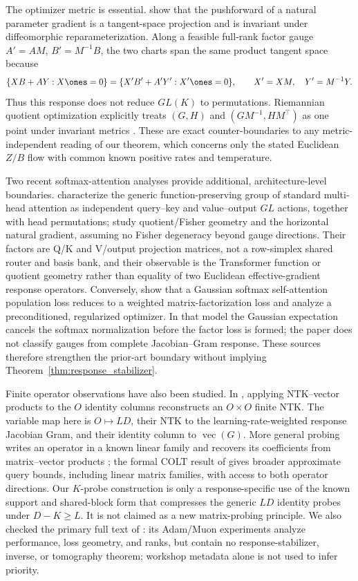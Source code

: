 The optimizer metric is essential.  \citet[Thms.~1--2]{vanoostrum2023invariance}
show that the pushforward of a natural parameter gradient is a tangent-space
projection and is invariant under diffeomorphic reparameterization.  Along a
feasible full-rank factor gauge $A'=AM$, $B'=M^{-1}B$, the two charts span the
same product tangent space because
\[
 \{XB+AY:X\ones=0\}
 =\{X'B'+A'Y':X'\ones=0\},
 \qquad X'=XM,\quad Y'=M^{-1}Y.
\]
Thus this response does not reduce $GL(K)$ to
permutations.  Riemannian quotient optimization explicitly treats
$(G,H)$ and $(GM^{-1},HM^\top)$ as one point under invariant metrics
\citep{mishra2014fixedrank}.  These are exact counter-boundaries to any
metric-independent reading of our theorem, which concerns only the stated
Euclidean $Z/B$ flow with common known positive rates and temperature.

Two recent softmax-attention analyses provide additional, architecture-level
boundaries.  \citet{wang2025complete} characterize the generic
function-preserving group of standard multi-head attention as independent
query--key and value--output $GL$ actions, together with head permutations;
\citet{wang2025gaugefiber} study quotient/Fisher geometry and the horizontal
natural gradient, assuming no Fisher degeneracy beyond gauge directions.
Their factors are Q/K and V/output projection
matrices, not a row-simplex shared router and basis bank, and their observable
is the Transformer function or quotient geometry rather than equality of two
Euclidean effective-gradient response operators.  Conversely,
\citet{goel2026training} show that a Gaussian softmax self-attention population
loss reduces to a weighted matrix-factorization loss and analyze a
preconditioned, regularized optimizer.  In that model the Gaussian expectation
cancels the softmax normalization before the factor loss is formed; the paper
does not classify gauges from complete Jacobian--Gram response.  These sources
therefore strengthen the prior-art boundary without implying
Theorem~\ref{thm:response_stabilizer}.

Finite operator observations have also been studied. In
\citet[Sec.~3.3, Eqs.~(7)--(9)]{novak2022fast}, applying NTK--vector products
to the $O$ identity columns reconstructs an $O\times O$ finite NTK.  The
variable map here is $O\mapsto LD$, their NTK to the learning-rate-weighted
response Jacobian Gram, and their identity column to $\operatorname{vec}(G)$.
More general probing writes an operator in a known linear family and recovers
its coefficients from matrix--vector products
\citep{chiu2012matrix,halikias2024structured,otto2023recovering}; the formal
COLT result of \citet{amsel2026query} gives broader approximate query bounds,
including linear matrix families, with access to both operator directions.
Our $K$-probe construction is only a response-specific use of the known
support and shared-block form that compresses the generic $LD$ identity
probes under $D-K\ge L$.  It is not claimed as a new matrix-probing
principle.  We also checked the primary full text of
\citet{stupariu2026optimizer}: its Adam/Muon experiments analyze performance,
loss geometry, and ranks, but contain no response-stabilizer, inverse, or
tomography theorem; workshop metadata alone is not used to infer priority.

